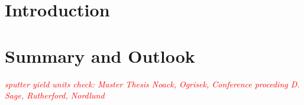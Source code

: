 \documentclass[12pt,
paper=a4,				
DIV=calc,		  %
BCOR=16mm,	  %
headinclude,
openany
]{scrbook}
\newcommand{\TODO}[1]{{\LARGE{\textcolor{red}{\emph {#1 }}}}}
\begin{document}



\small{\tableofcontents}

\chapter{Introduction}
\setcounter{page}{1}
\onehalfspacing













\chapter{Summary and Outlook}





\TODO{
sputter yield units check: Master Thesis Noack, Ogrisek, Conference proceding D. Sage, Rutherford, Nordlund}

\end{document}
